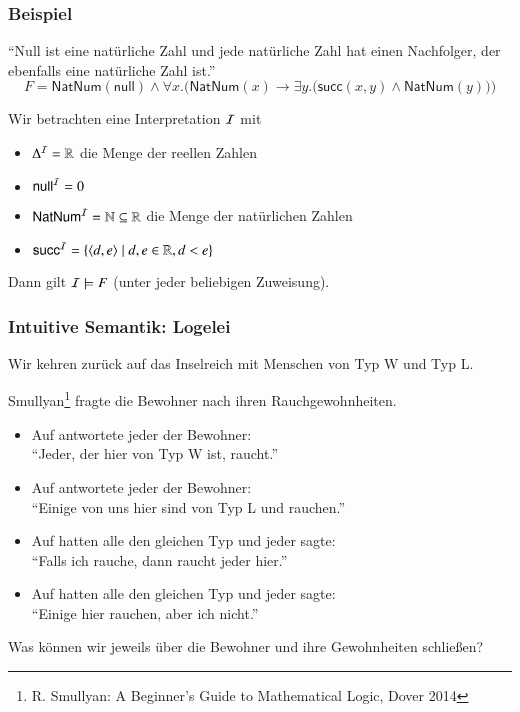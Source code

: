 \documentclass[onlymath]{beamer}
\begin{document}
\begin{frame}\frametitle{Beispiel}

\alert{"`Null ist eine natürliche Zahl und jede natürliche Zahl hat einen Nachfolger, der
ebenfalls eine natürliche Zahl ist."'}
\[ F=\textsf{NatNum}(\textsf{null})\wedge \forall x.\Big(\textsf{NatNum}(x)\to\exists y.\big(\textsf{succ}(x,y)\wedge \textsf{NatNum}(y)\big)\Big)\]

Wir betrachten eine Interpretation $\mathcal{I}$ mit
\begin{itemize}
\item $\Delta^{\mathcal{I}}=\mathbb{R}$ die Menge der reellen Zahlen
\item $\textsf{null}^{\mathcal{I}}=0$
\item $\textsf{NatNum}^{\mathcal{I}}=\mathbb{N}\subseteq\mathbb{R}$ die Menge der natürlichen Zahlen
\item $\textsf{succ}^{\mathcal{I}}=\{\langle{d,e}\rangle\mid d,e\in\mathbb{R},d<e\}$
\end{itemize}\bigskip

Dann gilt $\mathcal{I}\models F$ (unter jeder beliebigen Zuweisung).


\end{frame}

\begin{frame}\frametitle{Intuitive Semantik: Logelei}

Wir kehren zurück auf das Inselreich mit Menschen von
Typ W und Typ L.
\bigskip

Smullyan\footnote{R. Smullyan: A Beginner's Guide to Mathematical Logic, Dover 2014} fragte die Bewohner nach ihren Rauchgewohnheiten.\pause

\begin{itemize}
\item Auf  antwortete jeder der Bewohner:\\ \alert{"`Jeder, der hier von Typ W ist, raucht."'}\\
%
\item Auf  antwortete jeder der Bewohner:\\ \alert{"`Einige von uns hier sind von Typ L und rauchen."'}
%
\item Auf  hatten alle den gleichen Typ und jeder sagte:\\ \alert{"`Falls ich rauche, dann raucht jeder hier."'}
%
\item Auf  hatten alle den gleichen Typ und jeder sagte:\\ \alert{"`Einige hier rauchen, aber ich nicht."'}
\end{itemize}

Was können wir jeweils über die Bewohner und ihre Gewohnheiten schließen?

\end{frame}
\end{document}
